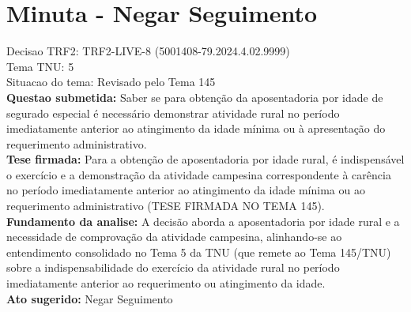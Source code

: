 \documentclass{article}
\begin{document}
\section*{Minuta - Negar Seguimento}
Decisao TRF2: TRF2-LIVE-8 (5001408-79.2024.4.02.9999)\\
Tema TNU: 5\\
Situacao do tema: Revisado pelo Tema 145\\
\textbf{Questao submetida:} Saber se para obtenção da aposentadoria por idade de segurado especial é necessário demonstrar atividade rural no período imediatamente anterior ao atingimento da idade mínima ou à apresentação do requerimento administrativo.\\
\textbf{Tese firmada:} Para a obtenção de aposentadoria por idade rural, é indispensável o exercício e a demonstração da atividade campesina correspondente à carência no período imediatamente anterior ao atingimento da idade mínima ou ao requerimento administrativo (TESE FIRMADA NO TEMA 145).\\
\textbf{Fundamento da analise:} A decisão aborda a aposentadoria por idade rural e a necessidade de comprovação da atividade campesina, alinhando-se ao entendimento consolidado no Tema 5 da TNU (que remete ao Tema 145/TNU) sobre a indispensabilidade do exercício da atividade rural no período imediatamente anterior ao requerimento ou atingimento da idade.\\
\textbf{Ato sugerido:} Negar Seguimento
\end{document}
